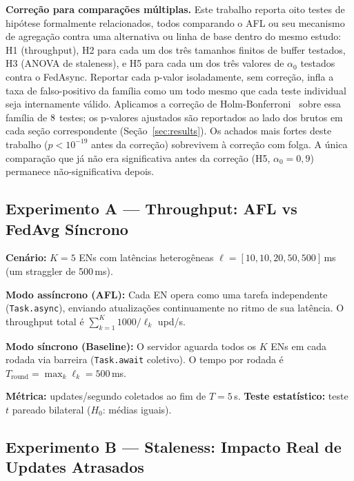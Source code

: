 \documentclass[conference,a4paper]{IEEEtran}
\begin{document}
\textbf{Correção para comparações múltiplas.} Este trabalho reporta oito
testes de hipótese formalmente relacionados, todos comparando o AFL ou seu
mecanismo de agregação contra uma alternativa ou linha de base dentro do
mesmo estudo: H1 (throughput), H2 para cada um dos três tamanhos finitos de
buffer testados, H3 (ANOVA de staleness), e H5 para cada um dos três
valores de $\alpha_0$ testados contra o FedAsync. Reportar cada p-valor
isoladamente, sem correção, infla a taxa de falso-positivo da família como
um todo mesmo que cada teste individual seja internamente válido. Aplicamos
a correção de Holm-Bonferroni~\cite{holm1979} sobre essa família de
$8$ testes; os p-valores ajustados são reportados ao lado
dos brutos em cada seção correspondente (Seção~\ref{sec:results}). Os
achados mais fortes deste trabalho ($p<10^{-19}$ antes da correção)
sobrevivem à correção com folga. A única comparação que já não era
significativa antes da correção (H5, $\alpha_0=0{,}9$) permanece
não-significativa depois.

\subsection{Experimento A --- Throughput: AFL vs FedAvg Síncrono}

\textbf{Cenário:} $K=5$ ENs com latências heterogêneas
$\ell = [10, 10, 20, 50, 500]$\,ms (um straggler de 500\,ms).

\textbf{Modo assíncrono (AFL):} Cada EN opera como uma tarefa independente
(\texttt{Task.async}), enviando atualizações continuamente no ritmo de sua
latência. O throughput total é $\sum_{k=1}^{K} 1000/\ell_k$ upd/s.

\textbf{Modo síncrono (Baseline):} O servidor aguarda todos os $K$ ENs em
cada rodada via barreira (\texttt{Task.await} coletivo). O tempo por rodada
é $T_{\text{round}} = \max_k \ell_k = 500$\,ms.

\textbf{Métrica:} updates/segundo coletados ao fim de $T=5$\,s.
\textbf{Teste estatístico:} teste $t$ pareado bilateral ($H_0$: médias iguais).

\subsection{Experimento B --- Staleness: Impacto Real de Updates Atrasados}
\label{sec:exp_b}
\end{document}
